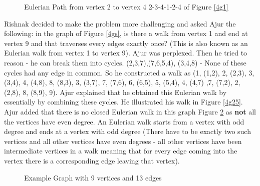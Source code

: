 \begin{figure}
\begin{center}
\caption{ Eulerian Path from vertex 2 to vertex 4 2-3-4-1-2-4 of Figure \ref{4g1}}\label{4g15}
\end{center}
\end{figure}
\vspace{2cm}
Rishnak decided to make the problem more challenging and asked Ajur the following: in the graph of Figure \ref{4gs}, is there a walk from vertex 1 and end at vertex 9 and that traverses every edges exactly once? (This is also known as an Eulerian walk from vertex 1 to vertex 9).
Ajur was perplexed. Then he tried to reason - he can break them into cycles. (2,3,7),(7,6,5,4), (3,4,8)  - None of these cycles had any edge in common. So he constructed a walk as (1, (1,2), 2, (2,3),
3, (3,4), 4, (4,8), 8, (8,3), 3, (3,7), 7, (7,6), 6, (6,5), 5, (5,4), 4, (4,7) ,7,
(7,2), 2, (2,8), 8, (8,9), 9). Ajur explained that he obtained this Eulerian walk by essentially by combining these cycles. He illustrated his walk in Figure \ref{4g25}. Ajur added that there is no closed Eulerian walk in this graph Figure \ref{4g2} as \textbf{not} all the vertices have even degree. An Eulerian walk starts from a vertex with odd degree and ends at a vertex with odd degree (There have to be exactly two such vertices and all other vertices have even degrees - all other vertices have been intermediate vertices in a walk meaning that for every edge coming into the vertex there is a corresponding edge leaving that vertex).

\begin{figure}
\begin{center}
\caption{ Example Graph with 9 vertices and 13 edges}\label{4g2}
\end{center}
\end{figure}

